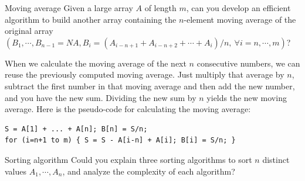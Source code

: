 \begin{problem}{Moving average}
Given a large array $A$ of length $m$, can you develop an efficient algorithm to build
another array containing the $n$-element moving average of the original array
$(B_1,\cdots,B_{n-1}=NA, B_i=(A_{i-n+1}+A_{i-n+2}+\cdots+A_i)/n,\ \forall i=n,\cdots,m)$?
\end{problem}

\begin{solution}
When we calculate the moving average of the next $n$ consecutive numbers, we can reuse
the previously computed moving average. Just multiply that average by $n$, subtract the
first number in that moving average and then add the new number, and you have the new
sum. Dividing the new sum by $n$ yields the new moving average. Here is the pseudo-code
for calculating the moving average:

\begin{verbatim}
S = A[1] + ... + A[n]; B[n] = S/n;
for (i=n+1 to m) { S = S - A[i-n] + A[i]; B[i] = S/n; }
\end{verbatim}

\end{solution}

\begin{problem}{Sorting algorithm}
Could you explain three sorting algorithms to sort $n$ distinct values
$A_1,\cdots,A_n$, and analyze the complexity of each algorithm?
\end{problem}

